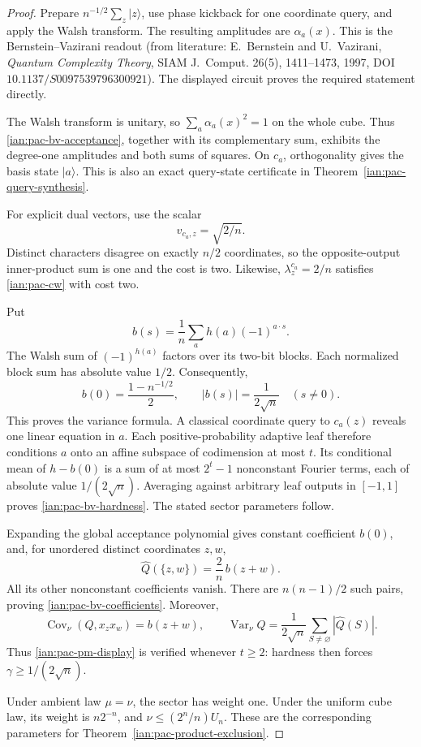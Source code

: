 \begin{proof}
Prepare \(n^{-1/2}\sum_z|z\rangle\), use phase kickback for one
coordinate query, and apply the Walsh transform.
The resulting amplitudes are \(\alpha_a(x)\).
This is the Bernstein--Vazirani readout (from literature:
E.~Bernstein and U.~Vazirani,
\emph{Quantum Complexity Theory}, SIAM J.~Comput. 26(5),
1411--1473, 1997, DOI \(10.1137/S0097539796300921\)).
The displayed circuit proves the required statement directly.

The Walsh transform is unitary, so
\(\sum_a\alpha_a(x)^2=1\) on the whole cube.
Thus \eqref{ian:pac-bv-acceptance}, together with its complementary
sum, exhibits the degree-one amplitudes and both sums of squares.
On \(c_a\), orthogonality gives the basis state \(|a\rangle\).
This is also an exact query-state certificate in
Theorem~\ref{ian:pac-query-synthesis}.

For explicit dual vectors, use the scalar
\[
 v_{c_a,z}=\sqrt{2/n}.
\]
Distinct characters disagree on exactly \(n/2\) coordinates, so
the opposite-output inner-product sum is one and the cost is two.
Likewise, \(\lambda_z^{c_a}=2/n\) satisfies
\eqref{ian:pac-cw} with cost two.

Put
\[
 b(s)=\frac1n\sum_a h(a)(-1)^{a\cdot s}.
\]
The Walsh sum of \((-1)^{h(a)}\) factors over its two-bit blocks.
Each normalized block sum has absolute value \(1/2\).
Consequently,
\[
 b(0)=\frac{1-n^{-1/2}}2,\qquad
 |b(s)|=\frac1{2\sqrt n}\quad(s\ne0).
\]
This proves the variance formula.
A classical coordinate query to \(c_a(z)\) reveals one linear
equation in \(a\). Each positive-probability adaptive leaf
therefore conditions \(a\) onto an affine subspace of codimension
at most \(t\). Its conditional mean of \(h-b(0)\) is a sum of at
most \(2^t-1\) nonconstant Fourier terms, each of absolute value
\(1/(2\sqrt n)\). Averaging against arbitrary leaf outputs in
\([-1,1]\) proves \eqref{ian:pac-bv-hardness}.
The stated sector parameters follow.

Expanding the global acceptance polynomial gives constant
coefficient \(b(0)\), and, for unordered distinct coordinates
\(z,w\),
\[
 \widehat Q(\{z,w\})=\frac2n\,b(z+w).
\]
All its other nonconstant coefficients vanish. There are
\(n(n-1)/2\) such pairs, proving
\eqref{ian:pac-bv-coefficients}.
Moreover,
\[
 \operatorname{Cov}_\nu(Q,x_zx_w)=b(z+w),
 \qquad
 \operatorname{Var}_\nu Q
   =\frac1{2\sqrt n}
       \sum_{S\ne\varnothing}|\widehat Q(S)|.
\]
Thus \eqref{ian:pac-pm-display} is verified whenever \(t\ge2\):
hardness then forces \(\gamma\ge1/(2\sqrt n)\).

Under ambient law \(\mu=\nu\), the sector has weight one.
Under the uniform cube law, its weight is
\(n2^{-n}\), and
\(\nu\le(2^n/n)U_n\).
These are the corresponding parameters for
Theorem~\ref{ian:pac-product-exclusion}.
\end{proof}

